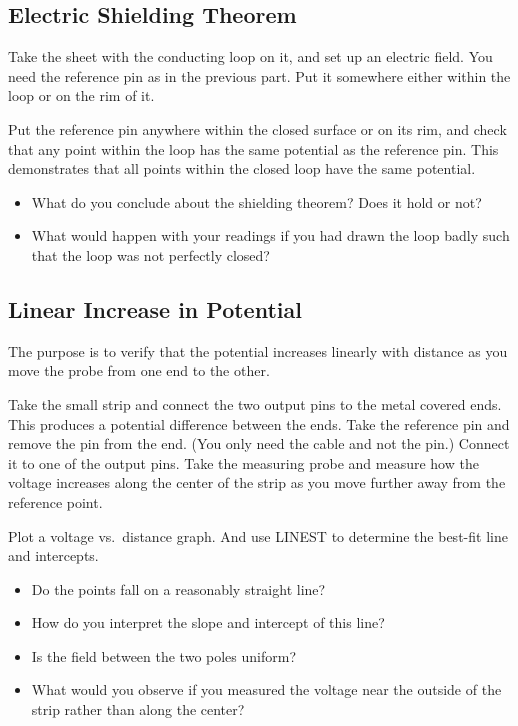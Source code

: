 \subsection{Electric Shielding Theorem}

Take the sheet with the conducting loop on it, and set up an electric field. You need the reference pin as in the previous part. Put it somewhere either within the loop or on the rim of it.\myskip

Put the reference pin anywhere within the closed surface or on its rim, and check that any point within the loop has the same potential as the reference pin. This demonstrates that all points within the closed loop have the same potential.
\begin{itemize}
    \item What do you conclude about the shielding theorem? Does it hold or not?
    \item What would happen with your readings if you had drawn the loop badly such that the loop was not perfectly closed?
\end{itemize}

\subsection{Linear Increase in Potential}

The purpose is to verify that the potential increases linearly with distance as you move the probe from one end to the other.\myskip

Take the small strip and connect the two output pins to the metal covered ends. This produces a potential difference between the ends. Take the reference pin and remove the pin from the end. (You only need the cable and not the pin.) Connect it to one of the output pins. Take the measuring probe and measure how the voltage increases along the center of the strip as you move further away from the reference point.\myskip

Plot a voltage vs.\ distance graph. And use LINEST to determine the best-fit line and intercepts.
\begin{itemize}
    \item Do the points fall on a reasonably straight line?
    \item How do you interpret the slope and intercept of this line?
    \item Is the field between the two poles uniform?
    \item What would you observe if you measured the voltage near the outside of the strip rather than along the center?
\end{itemize}

